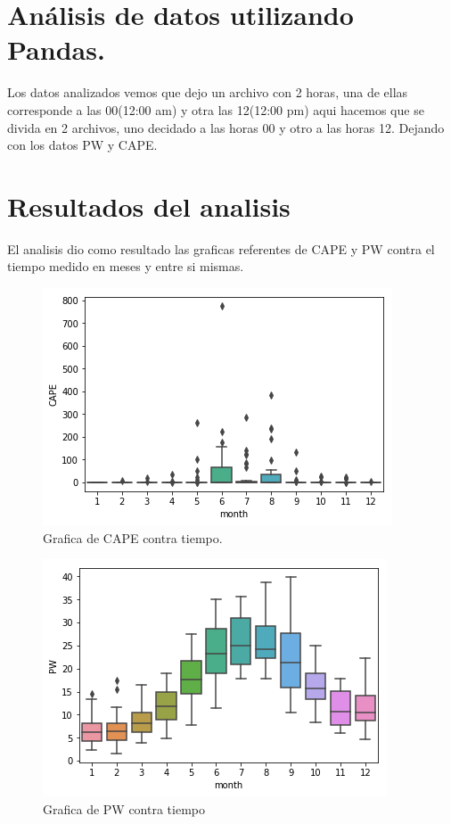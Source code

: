 \documentclass{article}
\begin{document}
\section{Análisis de datos utilizando Pandas.}
Los datos analizados vemos que dejo un archivo con 2 horas, una de ellas corresponde a las 00(12:00 am) y otra las 12(12:00 pm) aqui hacemos que se divida en 2 archivos, uno decidado a las horas 00 y otro a las horas 12. Dejando con los datos PW y CAPE.
\section{Resultados del analisis}
El analisis dio como resultado las graficas referentes de CAPE y PW contra el tiempo medido en meses y entre si mismas.
\begin{figure}
  \includegraphics[width=\linewidth]{mescape.png}
  \caption{Grafica de CAPE contra tiempo.}
\end{figure}
\begin{figure}
  \includegraphics[width=\linewidth]{mespw.png}
  \caption{Grafica de PW contra tiempo}
\end{figure}
\end{document}
